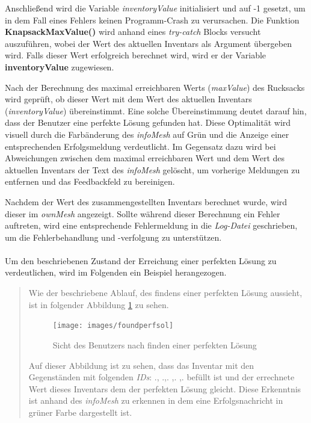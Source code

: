 Anschließend wird die Variable \textit{inventoryValue} initialisiert und auf -1 gesetzt, um in dem Fall eines Fehlers
keinen Programm-Crash zu verursachen. Die Funktion \textbf{KnapsackMaxValue()} wird anhand eines \textit{try-catch} Blocks
versucht auszuführen, wobei der Wert des aktuellen Inventars als Argument übergeben wird. Falls dieser Wert erfolgreich
berechnet wird, wird er der Variable \textbf{inventoryValue} zugewiesen.

Nach der Berechnung des maximal erreichbaren Werts (\textit{maxValue}) des Rucksacks wird geprüft, ob dieser Wert mit dem
Wert des aktuellen Inventars (\textit{inventoryValue}) übereinstimmt. Eine solche Übereinstimmung deutet darauf hin, dass
der Benutzer eine perfekte Lösung gefunden hat. Diese Optimalität wird visuell durch die Farbänderung des \textit{infoMesh}
auf Grün und die Anzeige einer entsprechenden Erfolgsmeldung verdeutlicht. Im Gegensatz dazu wird bei Abweichungen zwischen
dem maximal erreichbaren Wert und dem Wert des aktuellen Inventars der Text des \textit{infoMesh} gelöscht, um vorherige
Meldungen zu entfernen und das Feedbackfeld zu bereinigen.

Nachdem der Wert des zusammengestellten Inventars berechnet wurde, wird dieser im \textit{ownMesh} angezeigt. Sollte während
dieser Berechnung ein Fehler auftreten, wird eine entsprechende Fehlermeldung in die \textit{Log-Datei} geschrieben, um
die Fehlerbehandlung und -verfolgung zu unterstützen.\\
\\
Um den beschriebenen Zustand der Erreichung einer perfekten Lösung zu verdeutlichen, wird im Folgenden ein Beispiel herangezogen.

\begin{quote}
Wie der beschriebene Ablauf, des findens einer perfekten Lösung aussieht, ist in folgender Abbildung \ref{fig:foundperfsol}
zu sehen.
\begin{figure}[H]
\centering
\texttt{[image: images/foundperfsol]}
\caption{Sicht des Benutzers nach finden einer perfekten Lösung}
\label{fig:foundperfsol}
\end{figure}

Auf dieser Abbildung ist zu sehen, dass das Inventar mit den Gegenständen mit folgenden \textit{IDs}: ., .,. ,. ,. befüllt
ist und der errechnete Wert dieses Inventars dem der perfekten Lösung gleicht. Diese Erkenntnis ist anhand des \textit{infoMesh}
zu erkennen in dem eine Erfolgsnachricht in grüner Farbe dargestellt ist.
\end{quote}

